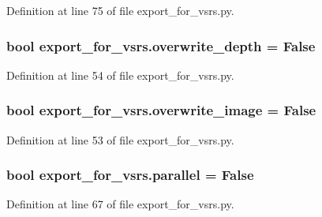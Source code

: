 Definition at line 75 of file export\+\_\+for\+\_\+vsrs.\+py.

\subsubsection[{\texorpdfstring{overwrite\+\_\+depth}{overwrite_depth}}]{\setlength{\rightskip}{0pt plus 5cm}bool export\+\_\+for\+\_\+vsrs.\+overwrite\+\_\+depth = False}\hypertarget{namespaceexport__for__vsrs_a3bd825d865a68f2a90e102b8c6c15d28}{}\label{namespaceexport__for__vsrs_a3bd825d865a68f2a90e102b8c6c15d28}


Definition at line 54 of file export\+\_\+for\+\_\+vsrs.\+py.

\subsubsection[{\texorpdfstring{overwrite\+\_\+image}{overwrite_image}}]{\setlength{\rightskip}{0pt plus 5cm}bool export\+\_\+for\+\_\+vsrs.\+overwrite\+\_\+image = False}\hypertarget{namespaceexport__for__vsrs_aa5ec74176e45ab6f4dc1e8fa5e4190b8}{}\label{namespaceexport__for__vsrs_aa5ec74176e45ab6f4dc1e8fa5e4190b8}


Definition at line 53 of file export\+\_\+for\+\_\+vsrs.\+py.

\subsubsection[{\texorpdfstring{parallel}{parallel}}]{\setlength{\rightskip}{0pt plus 5cm}bool export\+\_\+for\+\_\+vsrs.\+parallel = False}\hypertarget{namespaceexport__for__vsrs_ada70761c518dcc920057ee9d5baeab0b}{}\label{namespaceexport__for__vsrs_ada70761c518dcc920057ee9d5baeab0b}


Definition at line 67 of file export\+\_\+for\+\_\+vsrs.\+py.


